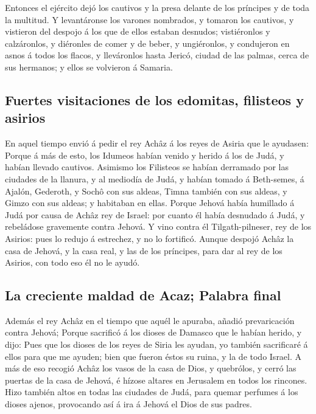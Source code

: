  Entonces el ejército dejó los cautivos y la presa delante
de los príncipes y de toda la multitud.  Y levantáronse los
varones nombrados, y tomaron los cautivos, y vistieron del despojo á los
que de ellos estaban desnudos; vistiéronlos y calzáronlos, y diéronles
de comer y de beber, y ungiéronlos, y condujeron en asnos á todos los
flacos, y lleváronlos hasta Jericó, ciudad de las palmas, cerca de sus
hermanos; y ellos se volvieron á Samaria.

\hypertarget{fuertes-visitaciones-de-los-edomitas-filisteos-y-asirios}{%
\subsection{Fuertes visitaciones de los edomitas, filisteos y
asirios}\label{fuertes-visitaciones-de-los-edomitas-filisteos-y-asirios}}

 En aquel tiempo envió á pedir el rey Achâz á los reyes de
Asiria que le ayudasen:  Porque á más de esto, los Idumeos
habían venido y herido á los de Judá, y habían llevado cautivos.
 Asimismo los Filisteos se habían derramado por las
ciudades de la llanura, y al mediodía de Judá, y habían tomado á
Beth-semes, á Ajalón, Gederoth, y Sochô con sus aldeas, Timna también
con sus aldeas, y Gimzo con sus aldeas; y habitaban en ellas.
 Porque Jehová había humillado á Judá por causa de Achâz
rey de Israel: por cuanto él había desnudado á Judá, y rebeládose
gravemente contra Jehová.  Y vino contra él
Tilgath-pilneser, rey de los Asirios: pues lo redujo á estrechez, y no
lo fortificó.  Aunque despojó Achâz la casa de Jehová, y la
casa real, y las de los príncipes, para dar al rey de los Asirios, con
todo eso él no le ayudó.

\hypertarget{la-creciente-maldad-de-acaz-palabra-final}{%
\subsection{La creciente maldad de Acaz; Palabra
final}\label{la-creciente-maldad-de-acaz-palabra-final}}

 Además el rey Achâz en el tiempo que aquél le apuraba,
añadió prevaricación contra Jehová;  Porque sacrificó á los
dioses de Damasco que le habían herido, y dijo: Pues que los dioses de
los reyes de Siria les ayudan, yo también sacrificaré á ellos para que
me ayuden; bien que fueron éstos su ruina, y la de todo Israel.
 A más de eso recogió Achâz los vasos de la casa de Dios, y
quebrólos, y cerró las puertas de la casa de Jehová, é hízose altares en
Jerusalem en todos los rincones.  Hizo también altos en
todas las ciudades de Judá, para quemar perfumes á los dioses ajenos,
provocando así á ira á Jehová el Dios de sus padres.

